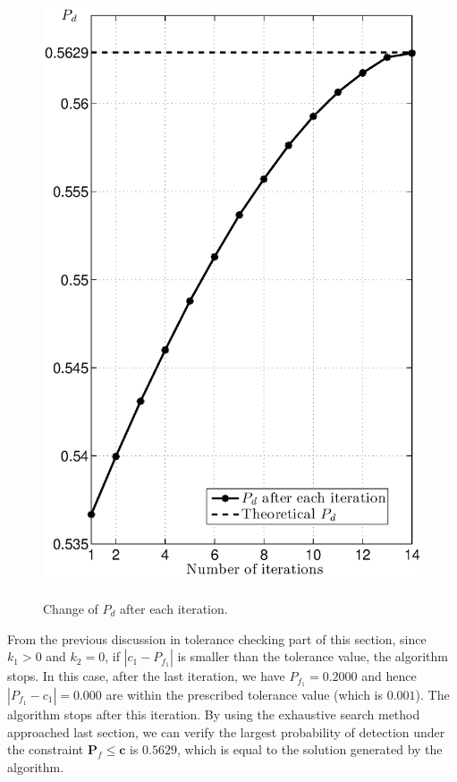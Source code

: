 \begin{figure}[H]
\centering
\includegraphics[width = 12cm , height = 18cm ]{2/24pd.eps}
\caption{Change of $P_d$ after each iteration.}
\label{fig: 2.5}
\end{figure}
\newpage

From the previous discussion in tolerance checking part of this section, since $k_1 > 0$ and $k_2 = 0$, if $ |c_1 - P_{f_1}| $ is smaller than the tolerance value, the algorithm stops. In this case, after the last iteration, we have $P_{f_1} = 0.2000$ and hence  $|P_{f_1} - c_1| = 0.000$ are within the prescribed tolerance value (which is $0.001$).  The algorithm stops after this iteration.   By using the exhaustive search method approached last section, we can verify the largest probability of detection under the constraint $\mathbf{P}_f \leq \mathbf{c}$ is $0.5629$, which is equal to the solution generated by the algorithm.
